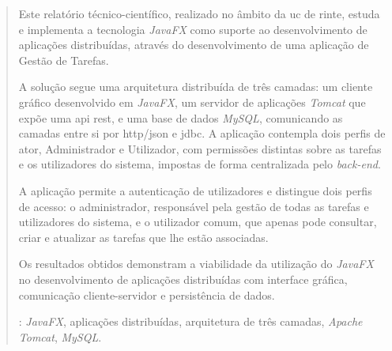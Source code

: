 

\begin{abstract}
\noindent Este relatório técnico-científico, realizado no âmbito da \ac{uc} de \ac{rinte}, estuda e implementa a tecnologia \textit{JavaFX} como suporte ao desenvolvimento de aplicações distribuídas, através do desenvolvimento de uma aplicação de Gestão de Tarefas. 

\noindent A solução segue uma arquitetura distribuída de três camadas: um cliente gráfico desenvolvido em \textit{JavaFX}, um servidor de aplicações \textit{Tomcat} que expõe uma \ac{api} \ac{rest}, e uma base de dados \textit{MySQL}, comunicando as camadas entre si por \ac{http}/\ac{json} e \ac{jdbc}. A aplicação contempla dois perfis de ator, Administrador e Utilizador, com permissões distintas sobre as tarefas e os utilizadores do sistema, impostas de forma centralizada pelo \textit{back-end}. 

\noindent A aplicação permite a autenticação de utilizadores e distingue dois perfis de acesso: o administrador, responsável pela gestão de todas as tarefas e utilizadores do sistema, e o utilizador comum, que apenas pode consultar, criar e atualizar as tarefas que lhe estão associadas.  

\noindent Os resultados obtidos demonstram a viabilidade da utilização do \textit{JavaFX} no desenvolvimento de aplicações distribuídas com interface gráfica, comunicação cliente-servidor e persistência de dados.

\vspace*{10mm} 
\noindent
\textbf{\keywordslabel}: \textit{JavaFX}, aplicações distribuídas, arquitetura de três camadas, \textit{Apache Tomcat}, \textit{MySQL}.

\end{abstract}
